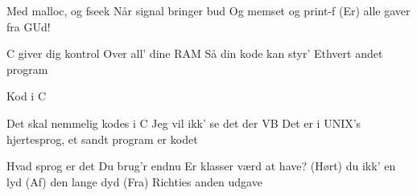 \documentclass[a4paper,11pt]{article}
\begin{document}
\begin{song}


   Med malloc, og fseek
  Når signal bringer bud
  Og memset og print-f
  (Er) alle gaver fra GUd!

   C giver dig kontrol
  Over all' dine RAM
  Så din kode kan styr'
  Ethvert andet program

   Kod i C




  
   Det skal nemmelig kodes i C
  Jeg vil ikk' se det der VB
  Det er i UNIX's hjertesprog, et sandt program er kodet

  
   Hvad sprog er det
  Du brug'r endnu
  Er klasser værd at have?
  (Hørt) du ikk' en lyd
  (Af) den lange dyd
  (Fra) Richties anden udgave

\end{song}
\end{document}
